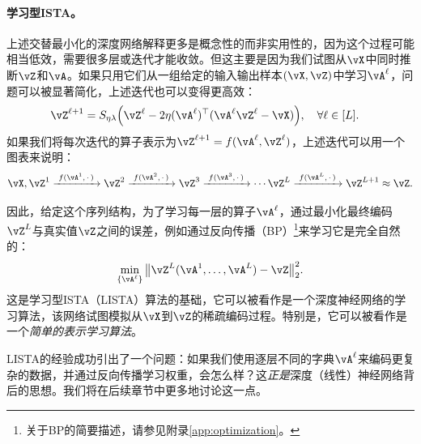 \documentclass[../../book-main.tex]{subfiles}
\begin{document}
\paragraph{学习型ISTA。} 上述交替最小化的深度网络解释更多是概念性的而非实用性的，因为这个过程可能相当低效，需要很多层或迭代才能收敛。但这主要是因为我们试图从\(\vX\)中同时推断\(\vZ\)和\(\vA\)。如果只用它们从一组给定的输入输出样本\((\vX, \vZ)\)中学习\(\vA^\ell\)，问题可以被显著简化，上述迭代也可以变得更高效：
\begin{align}
    & \vZ^{\ell + 1} = S_{\eta\lambda}\rp{\vZ^{\ell} - 2\eta(\vA^{\ell})^{\top}(\vA^\ell\vZ^{\ell} - \vX)}, \quad \forall \ell \in [L].
\end{align}
如果我们将每次迭代的算子表示为$\vZ^{\ell + 1} = f(\vA^\ell, \vZ^\ell)$，上述迭代可以用一个图表来说明：
\begin{equation*}
\vX, \vZ^1 \xrightarrow{\hspace{1mm} f(\vA^1,\,\cdot\,) \hspace{1mm}}  \vZ^2 \xrightarrow{\hspace{1mm} f(\vA^2,\,\cdot\,) \hspace{1mm}}  \vZ^3  \xrightarrow{\hspace{1mm} f(\vA^3,\,\cdot\,) \hspace{1mm}} \cdots \vZ^{L}  \xrightarrow{\hspace{1mm} f(\vA^{L},\,\cdot\,) \hspace{1mm}} \vZ^{L + 1} \approx \vZ.  
\label{eqn:deep-sparse-encoding}
\end{equation*}

因此，给定这个序列结构，为了学习每一层的算子\(\vA^\ell\)，通过最小化最终编码$\vZ^L$与真实值$\vZ$之间的误差，例如通过反向传播（BP）\footnote{关于BP的简要描述，请参见附录\ref{app:optimization}。}来学习它是完全自然的：
\begin{equation}
    \min_{\{\vA^\ell\}} \big\|\vZ^L(\vA^1, \ldots, \vA^{L}) - \vZ\big\|_2^2.
\end{equation}
这是学习型ISTA（LISTA）算法\cite{gregor2010learning}的基础，它可以被看作是一个深度神经网络的学习算法，该网络试图模拟从$\vX$到$\vZ$的稀疏编码过程。特别是，它可以被看作是一个\textit{简单的表示学习算法}。


LISTA的经验成功引出了一个问题：如果我们使用逐层不同的字典\(\vA^\ell\)来编码更复杂的数据，并通过反向传播学习权重，会怎么样？这\textit{正是}深度（线性）神经网络背后的思想。我们将在后续章节中更多地讨论这一点。

\end{document}
